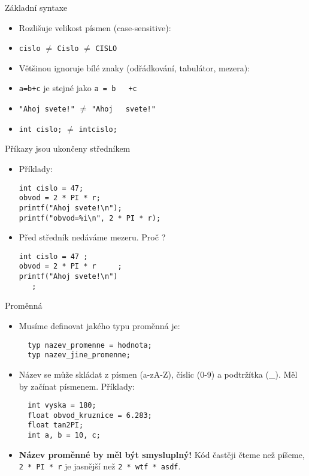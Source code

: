\documentclass{beamer}
\newenvironment{itemizex}%
  {\large \begin{itemize}%
    \setlength{\itemsep}{8pt}%
    \setlength{\parskip}{8pt}}%
  {\end{itemize}}
\begin{document}
\begin{frame}[t,fragile]{Základní syntaxe}
\begin{itemizex}
  \item Rozlišuje velikost písmen (case-sensitive): 
  \item \texttt{cislo} $\ne$ \texttt{Cislo} $\ne$ \texttt{CISLO}
  \item Většinou ignoruje bílé znaky (odřádkování, tabulátor, mezera): 
  \item \texttt{a=b+c} je stejné jako \texttt{a = b$\quad$ +c}
  \item \texttt{"Ahoj svete!"} $\ne$ \texttt{"Ahoj$\quad$ svete!"}
  \item \texttt{int cislo;} $\ne$ \texttt{intcislo;}
\end{itemizex}
\end{frame}


\begin{frame}[t,fragile]{Příkazy jsou ukončeny středníkem}
\begin{itemizex}
  \item Příklady:
\begin{verbatim} 
int cislo = 47;
obvod = 2 * PI * r;
printf("Ahoj svete!\n");
printf("obvod=%i\n", 2 * PI * r);
\end{verbatim} 
  \item Před středník nedáváme mezeru. Proč ? 
  \begin{verbatim} 
int cislo = 47 ;
obvod = 2 * PI * r     ;
printf("Ahoj svete!\n")
   ;
  \end{verbatim}
\end{itemizex}
\end{frame}



\begin{frame}[t,fragile]{Proměnná}
\begin{itemize}
  \item Musíme definovat jakého typu proměnná je:
  \begin{verbatim} 
  typ nazev_promenne = hodnota;
  typ nazev_jine_promenne;
  \end{verbatim}
  \item Název se může skládat z písmen (a-zA-Z), číslic (0-9) a podtržítka (\_). Měl by začínat písmenem. Příklady:
  \begin{verbatim} 
  int vyska = 180;
  float obvod_kruznice = 6.283;
  float tan2PI;
  int a, b = 10, c;
  \end{verbatim}
  \item \textbf{Název proměnné by měl být smysluplný!} Kód častěji čteme než píšeme, \texttt{2 * PI * r} je jasnější než \texttt{2 * wtf * asdf}.
\end{itemize}
\end{frame}
\end{document}
